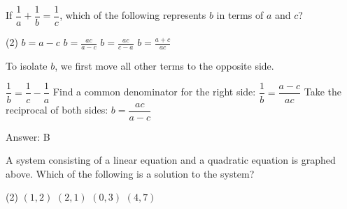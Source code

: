 \documentclass[11pt,paper=a4,answers]{exam}
\begin{document}
\begin{questions}
\vspace{1cm}

\question
If $\dfrac{1}{a} + \dfrac{1}{b} = \dfrac{1}{c}$, which of the following represents $b$ in terms of $a$ and $c$?
\begin{tasks}(2)
\task $b = a - c$
\task $b = \frac{ac}{a - c}$
\task $b = \frac{ac}{c - a}$
\task $b = \frac{a+c}{ac}$
\end{tasks}

\begin{solution}
To isolate $b$, we first move all other terms to the opposite side.
\vspace{5pt}
\begin{center}
$\dfrac{1}{b} = \dfrac{1}{c} - \dfrac{1}{a}$
\vspace{5pt}
Find a common denominator for the right side:
\vspace{5pt}
$\dfrac{1}{b} = \dfrac{a - c}{ac}$
\vspace{5pt}
Take the reciprocal of both sides:
\vspace{5pt}
$b = \dfrac{ac}{a - c}$
\end{center}
\vspace{5pt}
Answer: \colorbox{yellow!100}{B}
\end{solution}

\vspace{1cm}

\question
\begin{center}
\end{center}
A system consisting of a linear equation and a quadratic equation is graphed above. Which of the following is a solution to the system?
\begin{tasks}(2)
\task $(1, 2)$
\task $(2, 1)$
\task $(0, 3)$
\task $(4, 7)$
\end{tasks}


\end{questions}
\end{document}
